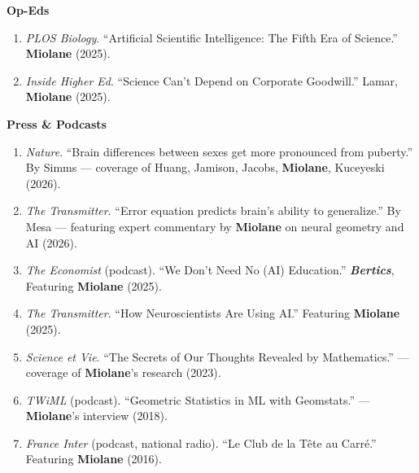 
\textbf{Op-Eds}
\begin{enumerate}[leftmargin=*,itemsep=0.2em,topsep=0.2em,parsep=0pt,partopsep=0pt]
    \item \textit{PLOS Biology}. ``Artificial Scientific Intelligence: The Fifth Era of Science.'' \textbf{Miolane} (2025).
    \item \textit{Inside Higher Ed}. ``Science Can't Depend on Corporate Goodwill.'' Lamar, \textbf{Miolane} (2025).
\end{enumerate}

\textbf{Press \& Podcasts}
\begin{enumerate}[leftmargin=*,itemsep=0.2em,topsep=0.2em,parsep=0pt,partopsep=0pt]
    \item \textit{Nature}. ``Brain differences between sexes get more pronounced from puberty.'' By Simms --- coverage of Huang, Jamison, Jacobs, \textbf{Miolane}, Kuceyeski (2026).
    \item \textit{The Transmitter}. ``Error equation predicts brain's ability to generalize.'' By Mesa --- featuring expert commentary by \textbf{Miolane} on neural geometry and AI (2026).
    \item \textit{The Economist} (podcast). ``We Don't Need No (AI) Education.'' \textit{\textbf{Bertics}}, Featuring \textbf{Miolane} (2025).
    \item \textit{The Transmitter}. ``How Neuroscientists Are Using AI.'' Featuring \textbf{Miolane} (2025).
    \item \textit{Science et Vie}. ``The Secrets of Our Thoughts Revealed by Mathematics.'' --- coverage of \textbf{Miolane}'s research (2023).
    \item \textit{TWiML} (podcast). ``Geometric Statistics in ML with Geomstats.'' --- \textbf{Miolane}'s interview (2018).
    \item \textit{France Inter} (podcast, national radio). ``Le Club de la Tête au Carré.'' Featuring \textbf{Miolane} (2016).
\end{enumerate}
